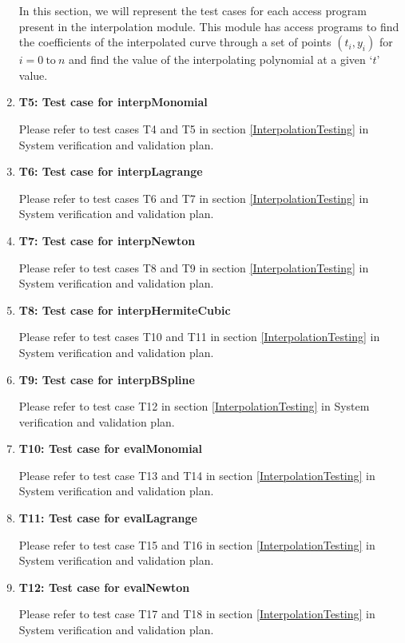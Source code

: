 \documentclass[12pt, titlepage]{article}
\begin{document}
\begin{enumerate}
In this section, we will represent the test cases for each access program 
present in the interpolation module. This module has access programs to find 
the coefficients of the interpolated curve through a set of points $(t_i,y_i)$ 
for $i = 0\ \text{to}\ n$ and find the value of the interpolating polynomial at 
a given `$t$' value.

\item{\textbf{T5: Test case for interpMonomial}}

Please refer to test cases T4 and T5 in section \ref{InterpolationTesting} in 
System verification 
and 
validation plan.


\item{\textbf{T6: Test case for interpLagrange}}

Please refer to test cases T6 and T7 in section \ref{InterpolationTesting} in 
System verification 
and 
validation plan.


\item{\textbf{T7: Test case for interpNewton}}

Please refer to test cases T8 and T9 in section \ref{InterpolationTesting} in 
System verification 
and 
validation plan.

\item{\textbf{T8: Test case for interpHermiteCubic}}

Please refer to test cases T10 and T11 in section \ref{InterpolationTesting} in 
System verification and validation plan.


\item{\textbf{T9: Test case for interpBSpline}}

Please refer to test case T12 in section \ref{InterpolationTesting} in System 
verification and validation plan.


\item{\textbf{T10: Test case for evalMonomial}}

Please refer to test case T13 and T14 in section \ref{InterpolationTesting} in 
System verification and validation plan.



\item{\textbf{T11: Test case for evalLagrange}}


Please refer to test case T15 and T16 in section \ref{InterpolationTesting} in 
System 
verification and validation plan.


\item{\textbf{T12: Test case for evalNewton}}

Please refer to test case T17 and T18 in section \ref{InterpolationTesting} in 
System 
verification and validation plan.



\end{enumerate}
\end{document}
